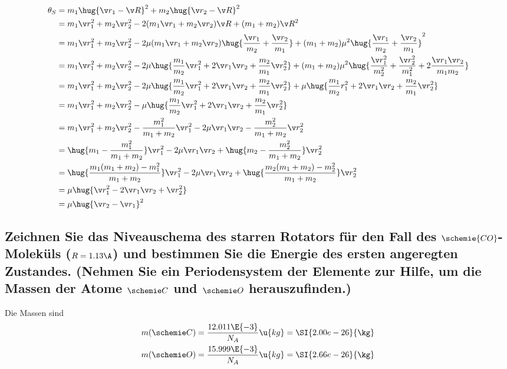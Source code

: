 \documentclass[ex]{exercise_4.1}
\begin{document}
\begin{align*}
    \theta_S 
    &= m_1 \hug{\v r_1 -\v R}^2 + m_2 \hug{\v r_2 -\v R}^2\\
    &= m_1 \v r_1^2 + m_2 \v r_2^2 - 2(m_1 \v r_1 + m_2 \v r_2) \v R + (m_1+m_2)\v R^2\\
    &= m_1 \v r_1^2 + m_2 \v r_2^2 - 2 \mu (m_1 \v r_1 + m_2 \v r_2) \hug{\frac{\v r_1}{m_2} + \frac{\v r_2}{m_1}} + (m_1+m_2)\mu^2\hug{\frac{\v r_1}{m_2} + \frac{\v r_2}{m_1}}^2\\
    &= m_1 \v r_1^2 + m_2 \v r_2^2 - 2\mu \hug{\frac{m_1}{m_2}\v r_1^2  + 2 \v r_1 \v r_2 + \frac{m_2}{m_1}\v r_2^2} + (m_1+m_2)\mu^2\hug{\frac{\v r_1^2}{m_2^2} + \frac{\v r_2^2}{m_1^2} + 2\frac{\v r_1\v r_2}{m_1 m_2}}\\
    &= m_1 \v r_1^2 + m_2 \v r_2^2 - 2\mu \hug{\frac{m_1}{m_2}\v r_1^2  + 2 \v r_1 \v r_2 + \frac{m_2}{m_1}\v r_2^2} + \mu\hug{\frac{m_1}{m_2}r_1^2 + 2\v r_1\v r_2 + \frac{m_2}{m_1}\v r_2^2}\\
    &= m_1 \v r_1^2 + m_2 \v r_2^2 - \mu\hug{\frac{m_1}{m_2}\v r_1^2  + 2 \v r_1 \v r_2 + \frac{m_2}{m_1}\v r_2^2} \\
    &= m_1 \v r_1^2 + m_2 \v r_2^2 - \frac{m_1^2}{m_1+m_2}\v r_1^2  - 2 \mu \v r_1 \v r_2 - \frac{m_2^2}{m_1 + m_2}\v r_2^2 \\
    &= \hug{m_1- \frac{m_1^2}{m_1+m_2}}\v r_1^2  - 2 \mu \v r_1 \v r_2 + \hug{m_2-\frac{m_2^2}{m_1 + m_2}}\v r_2^2 \\
    &= \hug{\frac{m_1(m_1+m_2) -m_1^2 }{m_1+m_2}}\v r_1^2  - 2 \mu \v r_1 \v r_2 + \hug{\frac{m_2(m_1 + m_2) - m_2^2}{m_1 + m_2}}\v r_2^2 \\
    &= \mu \hug{\v r_1^2  - 2 \v r_1 \v r_2 + \v r_2^2 }\\
    &= \mu \hug{\v r_2 - \v r_1}^2
\end{align*}

\subsection{Zeichnen Sie das Niveauschema des starren Rotators für den Fall des $\schemie{CO}$-Moleküls ($R = 1.13 \A$) und
bestimmen Sie die Energie des ersten angeregten Zustandes. (Nehmen Sie ein Periodensystem der
Elemente zur Hilfe, um die Massen der Atome $\schemie C$ und $\schemie O$ herauszufinden.)}

\dottedlinett

Die Massen sind 
\begin{align*}
    m(\schemie C) &= \frac{12.011\E{-3}}{N_A}\u{kg} 
    = \SI{2.00e-26}{\kg}\\
    m(\schemie O) &= \frac{15.999\E{-3}}{N_A}\u{kg} 
    = \SI{2.66e-26}{\kg}\\
\end{align*}
\end{document}
